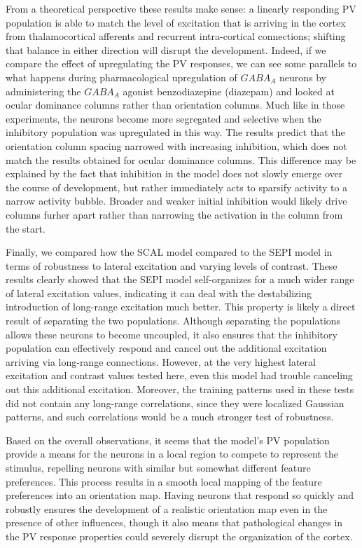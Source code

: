 From a theoretical perspective these results make sense: a linearly
responding PV population is able to match the level of excitation that
is arriving in the cortex from thalamocortical afferents and recurrent
intra-cortical connections; shifting that balance in either direction
will disrupt the development. Indeed, if we compare the effect of
upregulating the PV responses, we can see some parallels to what
happens during pharmacological upregulation of $GABA_A$ neurons by
administering the $GABA_A$ agonist benzodiazepine (diazepam)
\citep{Fagiolini2004,Hensch2004} and looked at ocular dominance
columns rather than orientation columns. Much like in those
experiments, the neurons become more segregated and selective when the
inhibitory population was upregulated in this way. The results predict
that the orientation column spacing narrowed with increasing
inhibition, which does not match the results obtained for ocular
dominance columns. This difference may be explained by the fact that
inhibition in the model does not slowly emerge over the course of
development, but rather immediately acts to sparsify activity to a
narrow activity bubble. Broader and weaker initial inhibition would
likely drive columns furher apart rather than narrowing the activation
in the column from the start.

Finally, we compared how the SCAL model compared to the SEPI model in
terms of robustness to lateral excitation and varying levels of
contrast. These results clearly showed that the SEPI model
self-organizes for a much wider range of lateral excitation values,
indicating it can deal with the destabilizing introduction of
long-range excitation much better. This property is likely a direct
result of separating the two populations. Although separating the
populations allows these neurons to become uncoupled, it also ensures
that the inhibitory population can effectively respond and cancel out
the additional excitation arriving via long-range
connections. However, at the very highest lateral excitation and
contrast values tested here, even this model had trouble canceling out
this additional excitation.  Moreover, the training patterns used in
these tests did not contain any long-range correlations, since they
were localized Gaussian patterns, and such correlations would be a
much stronger test of robustness.

Based on the overall observations, it seems that the model's PV
population provide a means for the neurons in a local region to
compete to represent the stimulus, repelling neurons with similar but
somewhat different feature preferences.  This process results in a
smooth local mapping of the feature preferences into an orientation
map. Having neurons that respond so quickly and robustly ensures the
development of a realistic orientation map even in the presence of
other influences, though it also means that pathological changes in
the PV response properties could severely disrupt the organization of
the cortex.

